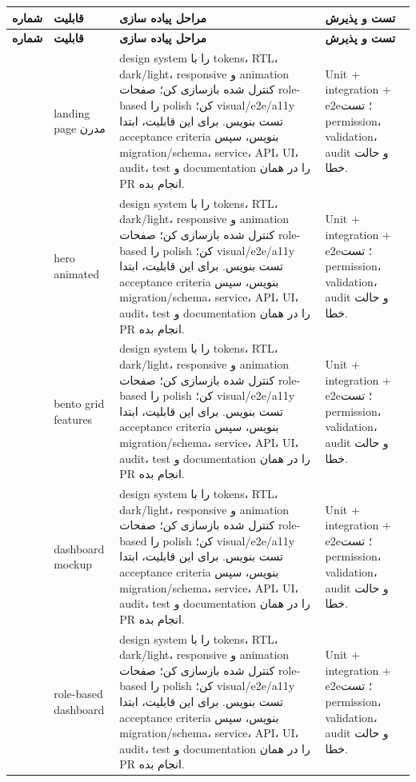 \documentclass[11pt,a4paper]{article}
\begin{document}
\begin{longtable}{|>{\raggedleft\arraybackslash}p{}|>{\raggedleft\arraybackslash}p{}|>{\raggedleft\arraybackslash}p{}|>{\raggedleft\arraybackslash}p{}|}
\hline
\textbf{شماره} & \textbf{قابلیت} & \textbf{مراحل پیاده سازی} & \textbf{تست و پذیرش} \\\hline
\endfirsthead
\hline
\textbf{شماره} & \textbf{قابلیت} & \textbf{مراحل پیاده سازی} & \textbf{تست و پذیرش} \\\hline
\endhead
261 & landing page مدرن & design system را با tokens، RTL، dark/light، responsive و animation کنترل شده بازسازی کن؛ صفحات role-based را polish کن؛ visual/e2e/a11y تست بنویس. برای این قابلیت، ابتدا acceptance criteria بنویس، سپس migration/schema، service، API، UI، audit، test و documentation را در همان PR انجام بده. & Unit + integration + e2e؛ تست permission، validation، audit و حالت خطا. \\ \hline
262 & hero animated & design system را با tokens، RTL، dark/light، responsive و animation کنترل شده بازسازی کن؛ صفحات role-based را polish کن؛ visual/e2e/a11y تست بنویس. برای این قابلیت، ابتدا acceptance criteria بنویس، سپس migration/schema، service، API، UI، audit، test و documentation را در همان PR انجام بده. & Unit + integration + e2e؛ تست permission، validation، audit و حالت خطا. \\ \hline
263 & bento grid features & design system را با tokens، RTL، dark/light، responsive و animation کنترل شده بازسازی کن؛ صفحات role-based را polish کن؛ visual/e2e/a11y تست بنویس. برای این قابلیت، ابتدا acceptance criteria بنویس، سپس migration/schema، service، API، UI، audit، test و documentation را در همان PR انجام بده. & Unit + integration + e2e؛ تست permission، validation، audit و حالت خطا. \\ \hline
264 & dashboard mockup & design system را با tokens، RTL، dark/light، responsive و animation کنترل شده بازسازی کن؛ صفحات role-based را polish کن؛ visual/e2e/a11y تست بنویس. برای این قابلیت، ابتدا acceptance criteria بنویس، سپس migration/schema، service، API، UI، audit، test و documentation را در همان PR انجام بده. & Unit + integration + e2e؛ تست permission، validation، audit و حالت خطا. \\ \hline
265 & role-based dashboard & design system را با tokens، RTL، dark/light، responsive و animation کنترل شده بازسازی کن؛ صفحات role-based را polish کن؛ visual/e2e/a11y تست بنویس. برای این قابلیت، ابتدا acceptance criteria بنویس، سپس migration/schema، service، API، UI، audit، test و documentation را در همان PR انجام بده. & Unit + integration + e2e؛ تست permission، validation، audit و حالت خطا. \\ \hline

\end{longtable}
\end{document}
